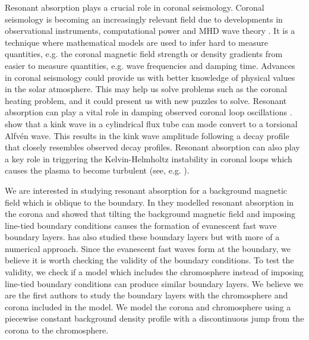 \documentclass[linenumbers]{aastex63}
\begin{document}
Resonant absorption plays a crucial role in coronal seismology. Coronal seismology is becoming an increasingly relevant field due to developments in observational instruments, computational power and MHD wave theory \citep{DeMoortel2012}. It is a technique where mathematical models are used to infer hard to measure quantities, e.g. the coronal magnetic field strength or density gradients from easier to measure quantities, e.g. wave frequencies and damping time. Advances in coronal seismology could provide us with better knowledge of physical values in the solar atmosphere. This may help us solve problems such as the coronal heating problem, and it could present us with new puzzles to solve. Resonant absorption can play a vital role in damping observed coronal loop oscillations \citep{Nakariakov1999,Terradas2006}. \citet{Ruderman2002} show that a kink wave in a cylindrical flux tube can mode convert to a torsional Alfvén wave. This results in the kink wave amplitude following a decay profile that closely resembles observed decay profiles. Resonant absorption can also play a key role in triggering the Kelvin-Helmholtz instability in coronal loops which causes the plasma to become turbulent (see, e.g. \citealt{Antolin2016,Howson2017}).

We are interested in studying resonant absorption for a background magnetic field which is oblique to the boundary. In \citet{Halberstadt1993,Halberstadt1995} they modelled resonant absorption in the corona and showed that tilting the background magnetic field and imposing line-tied boundary conditions causes the formation of evanescent fast wave boundary layers. \citet{Arregui2003} has also studied these boundary layers but with more of a numerical approach. Since the evanescent fast waves form at the boundary, we believe it is worth checking the validity of the boundary conditions. To test the validity, we check if a model which includes the chromosphere instead of imposing line-tied boundary conditions can produce similar boundary layers. We believe we are the first authors to study the boundary layers with the chromosphere and corona included in the model. We model the corona and chromosphere using a piecewise constant background density profile with a discontinuous jump from the corona to the chromosphere.
\end{document}

